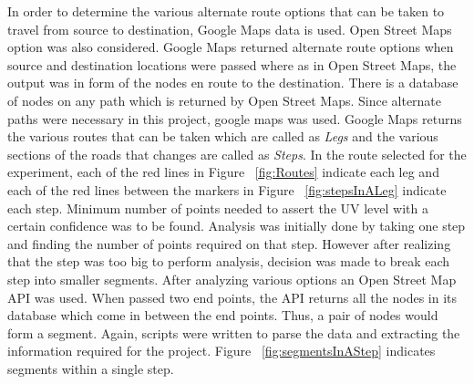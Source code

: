 \documentclass[12pt,fullpage,doublespace]{article}
\begin{document}
In order to determine the various alternate route options that can be taken to travel from source to destination, Google Maps \cite{googleMapsOriginal} data is used. Open Street Maps option was also considered. Google Maps returned alternate route options when source and destination locations were passed where as in Open Street Maps, the output was in form of the nodes en route to the destination. There is a database of nodes on any path which is returned by Open Street Maps. Since alternate paths were necessary in this project, google maps was used. Google Maps returns the various routes that can be taken which are called as {\it Legs} and the various sections of the roads that changes are called as {\it Steps}. In the route selected for the experiment, each of the red lines in Figure ~\ref{fig:Routes} indicate each leg and each of the red lines between the markers in Figure ~\ref{fig:stepsInALeg} indicate each step. Minimum number of points needed to assert the UV level with a certain confidence was to be found. Analysis was initially done by taking one step and finding the number of points required on that step. However after realizing that the step was too big to perform analysis, decision was made to break each step into smaller segments. After analyzing various options an Open Street Map API  \cite{openStreetMapsDirections} was used. When passed two end points, the API returns all the nodes in its database which come in between the end points. Thus, a pair of nodes would form a segment. Again, scripts were written to parse the data and extracting the information required for the project. Figure ~\ref{fig:segmentsInAStep} indicates segments within a single step. 
\end{document}
